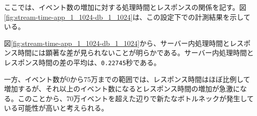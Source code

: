 \documentclass[../../../../../main]{subfiles}
\begin{document}
    \label{subsubsec:result-streaming-only-limit-time}


    ここでは、イベント数の増加に対する処理時間とレスポンスの関係を記す。図\ref{fig:stream-time-app_1_1024-db_1_1024}は、この設定下での計測結果を示している。

    

    図\ref{fig:stream-time-app_1_1024-db_1_1024}から、サーバー内処理時間とレスポンス時間には顕著な差が見られないことが明らかである。サーバー内処理時間とレスポンス時間の差の平均は、\texttt{0.22745}秒である。

    一方、イベント数が0から75万までの範囲では、レスポンス時間はほぼ比例して増加するが、それ以上のイベント数になるとレスポンス時間の増加が急激になる。このことから、70万イベントを超えた辺りで新たなボトルネックが発生している可能性が高いと考えられる。
\end{document}
